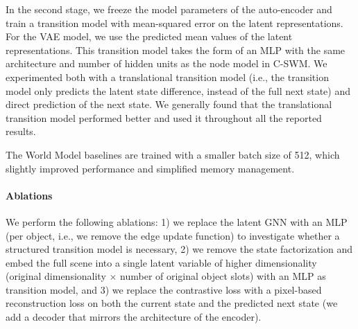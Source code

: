 \documentclass{article} %
\begin{document}
In the second stage, we freeze the model parameters of the auto-encoder and train a transition model with mean-squared error on the latent representations. For the VAE model, we use the predicted mean values of the latent representations. This transition model takes the form of an MLP with the same architecture and number of hidden units as the node model in C-SWM. We experimented both with a translational transition model (i.e., the transition model only predicts the latent state difference, instead of the full next state) and direct prediction of the next state. We generally found that the translational transition model performed better and used it throughout all the reported results.

The World Model baselines are trained with a smaller batch size of 512, which slightly improved performance and simplified memory management.

\paragraph{Ablations}
We perform the following ablations: 1) we replace the latent GNN with an MLP (per object, i.e., we remove the edge update function) to investigate whether a structured transition model is necessary, 2) we remove the state factorization and embed the full scene into a single latent variable of higher dimensionality (original dimensionality $\times$ number of original object slots) with an MLP as transition model, and 3) we replace the contrastive loss with a pixel-based reconstruction loss on both the current state and the predicted next state (we add a decoder that mirrors the architecture of the encoder).
\end{document}
